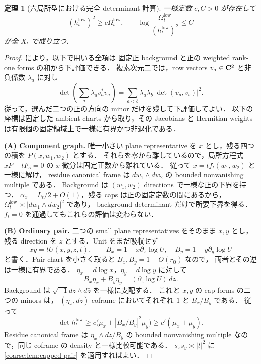 \documentclass[a4paper,11pt]{ltjsarticle}
\numberwithin{equation}{section}
\theoremstyle{plain}
\newtheorem{theorem}{定理}[section]
\theoremstyle{definition}
\theoremstyle{remark}
\begin{document}
\begin{theorem}[六局所型における完全 determinant 計算]\label{coarse:thm:global-determinant}
一様定数 $c,C>0$ が存在して
\begin{equation}\label{coarse:eq:global-determinant}
 (h_t^{\mathrm{low}})^2\ge c\Omega_t^{\mathrm{low}},
 \qquad
 \log\frac{\Omega_t^{\mathrm{low}}}{(h_t^{\mathrm{low}})^2}\le C
\end{equation}
が全 $X_t$ で成り立つ．
\end{theorem}

\begin{proof}
 により，以下で用いる全項は
固定正 background と正の weighted rank-one forms の和から下評価できる．
複素次元二では，row vectors $v_a\in\mathbf C^2$ と非負係数 $\lambda_a$ に対し
\[
 \det\!\left(\sum_a\lambda_a v_a^*v_a\right)
 =\sum_{a<b}\lambda_a\lambda_b
       |\det(v_a,v_b)|^2.
\]
従って，選んだ二つの正の方向の minor だけを残して下評価してよい．
以下の座標は固定した ambient charts から取り，その Jacobians と
Hermitian weights は有限個の固定領域上で一様に有界かつ非退化である．

\medskip\noindent
\textbf{(A) Component graph.}
唯一小さい plane representative を $x$ とし，残る四つの積を $P(x,w_1,w_2)$ とする．
それらを零から離しているので，局所方程式
$xP+tF_5=0$ の $x$ 微分は固定正数から離れている．
従って $x=tf_t(w_1,w_2)$ と一様に解け，
residue canonical frame は $dw_1\wedge dw_2$ の bounded nonvanishing multiple である．
Background は $(w_1,w_2)$ directions で一様な正の下界を持つ．
$\alpha_x=L_t/2+O(1)$，残る caps は正の固定定数の間にあるから，
$\Omega_t^{\mathrm{low}}\asymp |dw_1\wedge dw_2|^2$ であり，
background determinant だけで所要下界を得る．
$f_t=0$ を通過してもこれらの評価は変わらない．

\medskip\noindent
\textbf{(B) Ordinary pair.}
二つの small plane representatives をそのまま $x,y$ とし，
残る direction を $z$ とする．Unit をまだ吸収せず
\[
 xy=tU(x,y,z,t),\qquad
 B_x=1-x\partial_x\log U,\quad
 B_y=1-y\partial_y\log U
\]
と書く．Pair chart を小さく取ると $B_x,B_y=1+O(r_0)$ なので，
両者とその逆は一様に有界である．
$\eta_x=d\log x$，$\eta_y=d\log y$ に対して
\[
 B_x\eta_x+B_y\eta_y=(\partial_z\log U)\,dz.
\]
Background は $\sqrt{-1}dz\wedge d\bar z$ を一様に支配する．
これと $x,y$ の cap forms の二つの minors は，
$(\eta_x,dz)$ coframe においてそれぞれ $1$ と $B_x/B_y$ である．
従って
\[
 \det h_t^{\mathrm{low}}
 \ge c\bigl(\mu_x+|B_x/B_y|^2\mu_y\bigr)
 \ge c'(\mu_x+\mu_y).
\]
Residue canonical frame は $\eta_x\wedge dz/B_y$ の bounded
nonvanishing multiple なので，同じ coframe の density と一様比較可能である．
$s_xs_y\asymp|t|^2$ に \cref{coarse:lem:capped-pair} を適用すればよい．


\end{proof}
\end{document}
